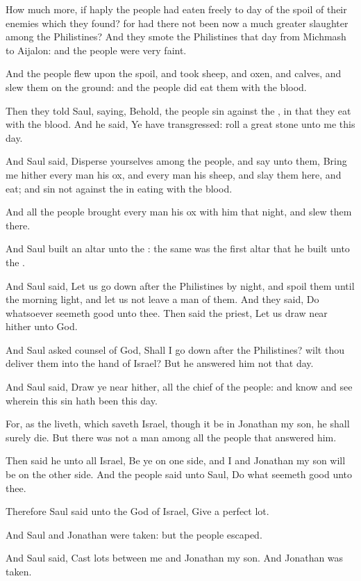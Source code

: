 \Verse How much more, if haply the people had eaten freely to day of the spoil of their enemies which they found? for had there not been now a much greater slaughter among the Philistines?  \Verse And they smote the Philistines that day from Michmash to Aijalon: and the people were very faint.

\Verse And the people flew upon the spoil, and took sheep, and oxen, and calves, and slew them on the ground: and the people did eat them with the blood.

\Verse Then they told Saul, saying, Behold, the people sin against the \LORD, in that they eat with the blood. And he said, Ye have transgressed: roll a great stone unto me this day.

\Verse And Saul said, Disperse yourselves among the people, and say unto them, Bring me hither every man his ox, and every man his sheep, and slay them here, and eat; and sin not against the \LORD in eating with the blood.

And all the people brought every man his ox with him that night, and slew them there.

\Verse And Saul built an altar unto the \LORD: the same was the first altar that he built unto the \LORD.

\Verse And Saul said, Let us go down after the Philistines by night, and spoil them until the morning light, and let us not leave a man of them. And they said, Do whatsoever seemeth good unto thee. Then said the priest, Let us draw near hither unto God.

\Verse And Saul asked counsel of God, Shall I go down after the Philistines? wilt thou deliver them into the hand of Israel? But he answered him not that day.

\Verse And Saul said, Draw ye near hither, all the chief of the people: and know and see wherein this sin hath been this day.

\Verse For, as the \LORD liveth, which saveth Israel, though it be in Jonathan my son, he shall surely die. But there was not a man among all the people that answered him.

\Verse Then said he unto all Israel, Be ye on one side, and I and Jonathan my son will be on the other side. And the people said unto Saul, Do what seemeth good unto thee.

\Verse Therefore Saul said unto the \LORD God of Israel, Give a perfect lot.

And Saul and Jonathan were taken: but the people escaped.

\Verse And Saul said, Cast lots between me and Jonathan my son. And Jonathan was taken.

